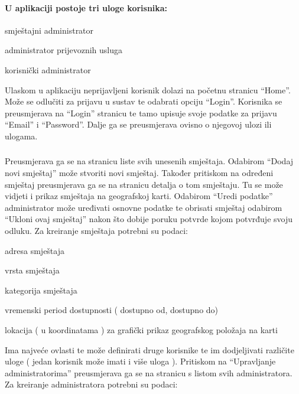 		
		\paragraph{\indent \textmd{U aplikaciji postoje tri uloge korisnika:}}
		
		\begin{packed_item}
			\item smještajni administrator
			\item administrator prijevoznih usluga
			\item korisnički administrator
		\end{packed_item}
		
		\noindent Ulaskom u aplikaciju neprijavljeni korisnik dolazi na početnu stranicu “Home”. Može se odlučiti za prijavu u sustav te odabrati opciju “Login”. Korisnika se preusmjerava na “Login” stranicu te tamo upisuje svoje podatke za prijavu “Email” i “Password”. Dalje ga se preusmjerava ovisno o njegovoj ulozi ili ulogama.
		
		\subsubsection{\noindent {}}
		
		Preusmjerava ga se na stranicu liste svih unesenih smještaja. Odabirom “Dodaj novi smještaj”  može stvoriti novi smještaj. Također pritiskom na određeni smještaj preusmjerava ga se na stranicu detalja o tom smještaju. Tu se može vidjeti i prikaz smještaja na geografskoj karti. Odabirom “Uredi podatke” administrator može uređivati osnovne podatke te obrisati smještaj odabirom “Ukloni ovaj smještaj” nakon što dobije poruku potvrde kojom potvrđuje svoju odluku. Za kreiranje smještaja potrebni su podaci:
		 
		\begin{packed_item}
			\item adresa smještaja
			\item vrsta smještaja
			\item kategorija smještaja
			\item vremenski period dostupnosti ( dostupno od, dostupno do) 
			\item lokacija ( u koordinatama ) za grafički prikaz geografskog položaja na karti 
		\end{packed_item}
		
		\noindent Ima najveće ovlasti te može definirati druge korisnike te im dodjeljivati različite uloge ( jedan korisnik može imati i više uloga ). Pritiskom na “Upravljanje administratorima” preusmjerava ga se na stranicu s listom svih administratora. Za kreiranje administratora potrebni su podaci: 
		
